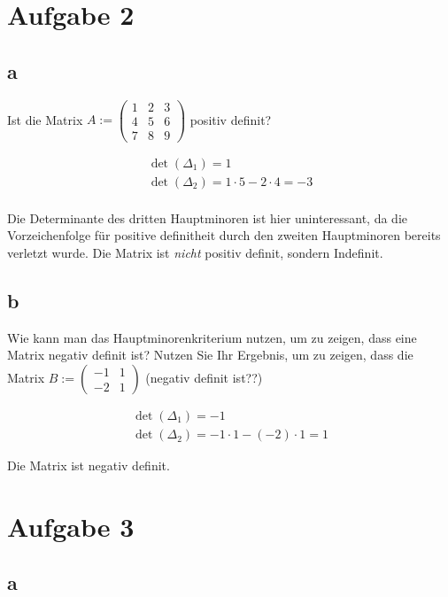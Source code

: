 \section{Aufgabe 2}

\subsection{a}

Ist die Matrix $A := \begin{pmatrix}
        1 & 2 & 3 \\
        4 & 5 & 6 \\
        7 & 8 & 9
    \end{pmatrix}$ positiv definit?

\begin{align*}
    \det(\Delta_1) = 1                          \\
    \det(\Delta_2) = 1 \cdot 5 - 2 \cdot 4 = -3 \\
\end{align*}

Die Determinante des dritten Hauptminoren ist hier uninteressant, da die
Vorzeichenfolge für positive definitheit durch den zweiten Hauptminoren bereits
verletzt wurde. Die Matrix ist \textit{nicht} positiv definit, sondern
Indefinit.

\subsection{b}
Wie kann man das Hauptminorenkriterium nutzen, um zu zeigen, dass eine Matrix
negativ definit ist? Nutzen Sie Ihr Ergebnis, um zu zeigen, dass die Matrix $B
    := \begin{pmatrix}
        -1 & 1 \\
        -2 & 1
    \end{pmatrix}$ (negativ definit ist??)

\begin{align*}
    \det(\Delta_1) = -1 \\
    \det(\Delta_2) = -1 \cdot 1 - (-2) \cdot 1 = 1
\end{align*}

Die Matrix ist negativ definit.

\section{Aufgabe 3}

\subsection{a}

